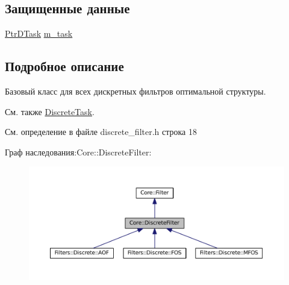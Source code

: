 \subsection*{Защищенные данные}
\begin{DoxyCompactItemize}
\item 
\hyperlink{namespace_core_a9cd3f9b81303651b8d115031018f0ebf}{Ptr\+D\+Task} \hyperlink{class_core_1_1_discrete_filter_a6a2d67be8eaa0df383fe080474975faa}{m\+\_\+task}
\end{DoxyCompactItemize}


\subsection{Подробное описание}
Базовый класс для всех дискретных фильтров оптимальной структуры. 

\begin{DoxySeeAlso}{См. также}
\hyperlink{class_core_1_1_discrete_task}{Discrete\+Task}. 
\end{DoxySeeAlso}


См. определение в файле discrete\+\_\+filter.\+h строка 18



Граф наследования\+:Core\+:\+:Discrete\+Filter\+:
\nopagebreak
\begin{figure}[H]
\begin{center}
\leavevmode
\includegraphics[width=350pt]{class_core_1_1_discrete_filter__inherit__graph}
\end{center}
\end{figure}


